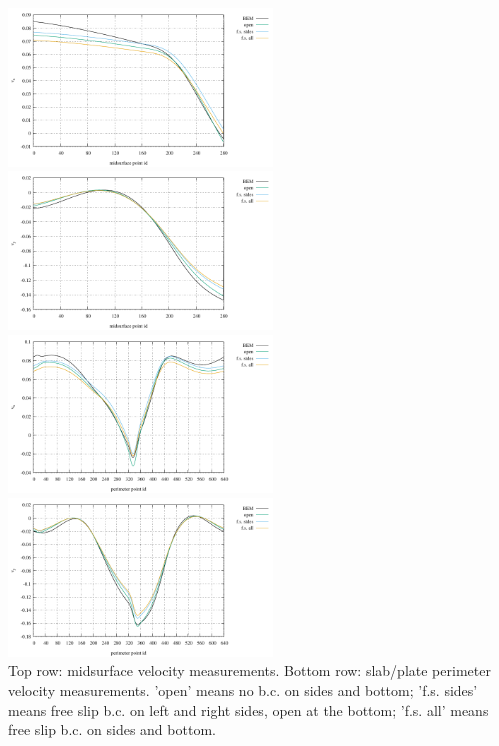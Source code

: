 \begin{center}
\includegraphics[width=7cm]{python_codes/fieldstone_55/images/u_midsurface}
\includegraphics[width=7cm]{python_codes/fieldstone_55/images/v_midsurface}\\
\includegraphics[width=7cm]{python_codes/fieldstone_55/images/u_perimeter}
\includegraphics[width=7cm]{python_codes/fieldstone_55/images/v_perimeter}\\
{\scriptsize Top row: midsurface velocity measurements. Bottom row: slab/plate perimeter 
velocity measurements. 'open' means no b.c. on sides and bottom; 'f.s. sides' means 
free slip b.c. on left and right sides, open at the bottom; 'f.s. all' means 
free slip b.c. on sides and bottom.}
\end{center}




